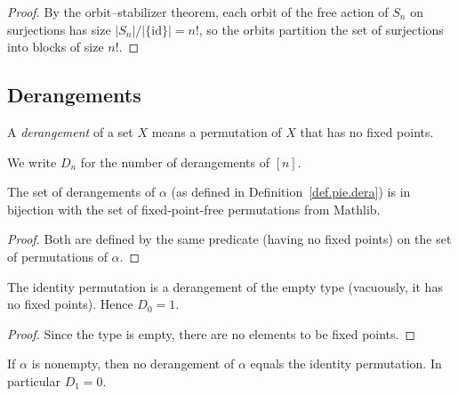 \begin{proof}
By the orbit--stabilizer theorem, each orbit of the free action of $S_n$
on surjections has size $|S_n|/|\{\mathrm{id}\}| = n!$, so the orbits partition
the set of surjections into blocks of size $n!$.
\end{proof}

\subsection{Derangements}

\begin{definition}
\label{def.pie.dera}
\leantarget
\leanok
A \emph{derangement} of a set $X$ means a permutation of $X$ that has no fixed points.
\end{definition}

We write $D_n$ for the number of derangements of $[n]$.

\begin{lemma}
\label{lem.pie.equivDerangements}
\leanhelper
\leanok
The set of derangements of $\alpha$ (as defined in Definition~\ref{def.pie.dera})
is in bijection with the set of fixed-point-free permutations
from Mathlib.
\end{lemma}

\begin{proof}
\leanok
Both are defined by the same predicate
(having no fixed points) on the set of permutations of $\alpha$.
\end{proof}

\begin{lemma}
\label{lem.pie.derangement-empty}
\leanhelper
\leanok
The identity permutation is a derangement of the empty type
(vacuously, it has no fixed points). Hence $D_0 = 1$.
\end{lemma}

\begin{proof}
\leanok
Since the type is empty, there are no elements to be fixed points.
\end{proof}

\begin{lemma}
\label{lem.pie.derangement-nonempty}
\leanhelper
\leanok
If $\alpha$ is nonempty, then no derangement of $\alpha$ equals the identity
permutation. In particular $D_1 = 0$.
\end{lemma}


